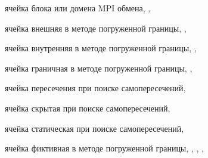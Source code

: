 ячейка блока или домена MPI обмена, \pageref{term:cell_block_mpi}, \pageref{term:cell_block_mpi2}

ячейка внешняя в методе погруженной границы, \pageref{term:cell_ibm_outer}, \pageref{term:cell_ibm_outer2}

ячейка внутренняя в методе погруженной границы, \pageref{term:cell_ibm_innner}, \pageref{term:cell_ibm_innner2}

ячейка граничная в методе погруженной границы, \pageref{term:cell_ibm_border}, \pageref{term:cell_ibm_border2}

ячейка пересечения при поиске самопересечений, \pageref{term:cell_intersect}

ячейка скрытая при поиске самопересечений, \pageref{term:cell_hidden}

ячейка статическая при поиске самопересечений, \pageref{term:cell_static}

ячейка фиктивная в методе погруженной границы, \pageref{term:cell_ibm_ghost}, \pageref{term:cell_ibm_ghost2}, \pageref{term:cell_ibm_ghost3}, \pageref{term:cell_ibm_ghost4}
